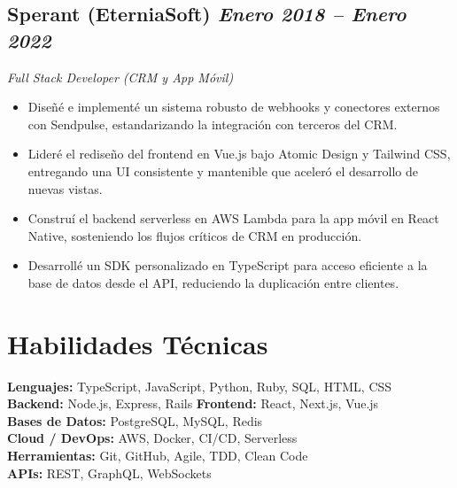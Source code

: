 \documentclass[10pt]{article}
\begin{document}
\subsection*{Sperant (EterniaSoft) \hfill \textnormal{\textit{Enero 2018 -- Enero 2022}}}
\textit{Full Stack Developer (CRM y App Móvil)}
\begin{itemize}
  \item Diseñé e implementé un sistema robusto de webhooks y conectores externos con Sendpulse, estandarizando la integración con terceros del CRM.
  \item Lideré el rediseño del frontend en Vue.js bajo Atomic Design y Tailwind CSS, entregando una UI consistente y mantenible que aceleró el desarrollo de nuevas vistas.
  \item Construí el backend serverless en AWS Lambda para la app móvil en React Native, sosteniendo los flujos críticos de CRM en producción.
  \item Desarrollé un SDK personalizado en TypeScript para acceso eficiente a la base de datos desde el API, reduciendo la duplicación entre clientes.
\end{itemize}


\vspace{1.5em}
\section{Habilidades Técnicas}
\noindent
\vspace{0.3em}
\textbf{Lenguajes:} TypeScript, JavaScript, Python, Ruby, SQL, HTML, CSS \\
\vspace{0.3em}
\textbf{Backend:} Node.js, Express, Rails \quad \textbf{Frontend:} React, Next.js, Vue.js \\
\vspace{0.3em}
\textbf{Bases de Datos:} PostgreSQL, MySQL, Redis \\
\vspace{0.3em}
\textbf{Cloud / DevOps:} AWS, Docker, CI/CD, Serverless \\
\vspace{0.3em}
\textbf{Herramientas:} Git, GitHub, Agile, TDD, Clean Code \\
\vspace{0.3em}
\textbf{APIs:} REST, GraphQL, WebSockets


\vspace{1.5em}
\end{document}
